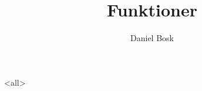 \documentclass[ignoreframetext]{beamer}
\begin{document}
\title{%
  Funktioner
}
\author{Daniel Bosk}

\begin{frame}
  \maketitle
\end{frame}

\mode<all>

\mode*
%

\end{document}

